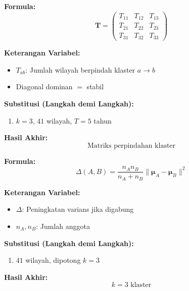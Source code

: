 \documentclass[11pt,a4paper]{article}
\begin{document}
\begin{tcolorbox}[formula_box, title={27. Matriks Transisi Temporal}]
\textbf{Formula:}
\[\mathbf{T}=\begin{pmatrix}T_{11}&T_{12}&T_{13}\\T_{21}&T_{22}&T_{23}\\T_{31}&T_{32}&T_{33}\end{pmatrix}\]

\textbf{Keterangan Variabel:}
\begin{itemize}
  \item $T_{ab}$: Jumlah wilayah berpindah klaster $a\to b$
  \item Diagonal dominan $=$ stabil
\end{itemize}

\textbf{Substitusi (Langkah demi Langkah):}
\begin{enumerate}
  \item $k=3$, $41$ wilayah, $T=5$ tahun
\end{enumerate}

\textbf{Hasil Akhir:}
\[ \text{Matriks perpindahan klaster} \]
\end{tcolorbox}

\begin{tcolorbox}[formula_box, title={28. Ward's Linkage (Dendrogram)}]
\textbf{Formula:}
\[\Delta(A,B)=\frac{n_A n_B}{n_A+n_B}\|\boldsymbol{\mu}_A-\boldsymbol{\mu}_B\|^2\]

\textbf{Keterangan Variabel:}
\begin{itemize}
  \item $\Delta$: Peningkatan varians jika digabung
  \item $n_A,n_B$: Jumlah anggota
\end{itemize}

\textbf{Substitusi (Langkah demi Langkah):}
\begin{enumerate}
  \item $41$ wilayah, dipotong $k=3$
\end{enumerate}

\textbf{Hasil Akhir:}
\[ k=3 \text{ klaster} \]
\end{tcolorbox}
\end{document}
